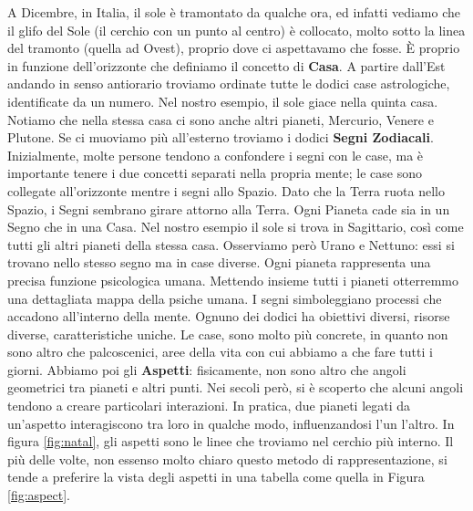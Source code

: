 A Dicembre, in Italia, il sole è tramontato da qualche ora, ed infatti vediamo che il glifo del Sole (il cerchio con un punto al centro) è collocato, molto sotto la linea del tramonto (quella ad Ovest), proprio dove ci aspettavamo che fosse.\newline
È proprio in funzione dell'orizzonte che definiamo il concetto di \textbf{Casa}. A partire dall'Est andando in senso antiorario troviamo ordinate tutte le dodici case astrologiche, identificate da un numero.\newline
Nel nostro esempio, il sole giace nella quinta casa. Notiamo che nella stessa casa ci sono anche altri pianeti, Mercurio, Venere e Plutone. Se ci muoviamo più all'esterno troviamo i dodici \textbf{Segni Zodiacali}. Inizialmente, molte persone tendono a confondere i segni con le case, ma è importante tenere i due concetti separati nella propria mente; le case sono collegate all'orizzonte mentre i segni allo Spazio. Dato che la Terra ruota nello Spazio, i Segni sembrano girare attorno alla Terra.\newline
Ogni Pianeta cade sia in un Segno che in una Casa. Nel nostro esempio il sole si trova in Sagittario, così come tutti gli altri pianeti della stessa casa. Osserviamo però Urano e Nettuno: essi si trovano nello stesso segno ma in case diverse.\newline
Ogni pianeta rappresenta una precisa funzione psicologica umana. Mettendo insieme tutti i pianeti otterremmo una dettagliata mappa della psiche umana. I segni simboleggiano processi che accadono all'interno della mente. Ognuno dei dodici ha obiettivi diversi, risorse diverse, caratteristiche uniche.
Le case, sono molto più concrete, in quanto non sono altro che palcoscenici, aree della vita con cui abbiamo a che fare tutti i giorni.\newline
Abbiamo poi gli \textbf{Aspetti}: fisicamente, non sono altro che angoli geometrici tra pianeti e altri punti.\newline
Nei secoli però, si è scoperto che alcuni angoli tendono a creare particolari interazioni. In pratica, due pianeti legati da un'aspetto interagiscono tra loro in qualche modo, influenzandosi l'un l'altro. In figura \ref{fig:natal}, gli aspetti sono le linee che troviamo nel cerchio più interno. Il più delle volte, non essenso molto chiaro questo metodo di rappresentazione, si tende a preferire la vista degli aspetti in una tabella come quella in Figura \ref{fig:aspect}.
